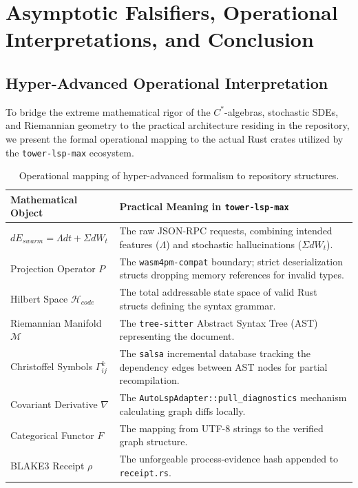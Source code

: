 \chapter{Asymptotic Falsifiers, Operational Interpretations, and Conclusion}
\label{ch:falsifiers_conclusion}

\section{Hyper-Advanced Operational Interpretation}

To bridge the extreme mathematical rigor of the $C^*$-algebras, stochastic SDEs, and Riemannian geometry to the practical architecture residing in the repository, we present the formal operational mapping to the actual Rust crates utilized by the \texttt{tower-lsp-max} ecosystem.

\begin{table}[h]
\centering
\begin{tabular}{|l|p{11.5cm}|}
\hline
\textbf{Mathematical Object} & \textbf{Practical Meaning in \texttt{tower-lsp-max}} \\ \hline
$dE_{swarm} = \Lambda dt + \Sigma dW_t$ & The raw JSON-RPC requests, combining intended features ($\Lambda$) and stochastic hallucinations ($\Sigma dW_t$). \\ \hline
Projection Operator $P$ & The \texttt{wasm4pm-compat} boundary; strict deserialization structs dropping memory references for invalid types. \\ \hline
Hilbert Space $\mathcal{H}_{code}$ & The total addressable state space of valid Rust structs defining the syntax grammar. \\ \hline
Riemannian Manifold $\mathcal{M}$ & The \texttt{tree-sitter} Abstract Syntax Tree (AST) representing the document. \\ \hline
Christoffel Symbols $\Gamma^k_{ij}$ & The \texttt{salsa} incremental database tracking the dependency edges between AST nodes for partial recompilation. \\ \hline
Covariant Derivative $\nabla$ & The \texttt{AutoLspAdapter::pull\_diagnostics} mechanism calculating graph diffs locally. \\ \hline
Categorical Functor $F$ & The mapping from UTF-8 strings to the verified graph structure. \\ \hline
BLAKE3 Receipt $\rho$ & The unforgeable process-evidence hash appended to \texttt{receipt.rs}. \\ \hline
\end{tabular}
\caption{Operational mapping of hyper-advanced formalism to repository structures.}
\label{tab:operational_mapping}
\end{table}

